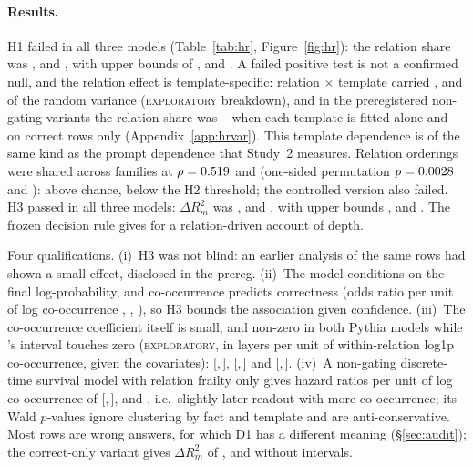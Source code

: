 \documentclass[11pt]{article}
\newcommand{\DRsq}{\ensuremath{\Delta R^{2}_{m}}\xspace} %
\newcommand{\expl}{\textsc{exploratory}\xspace}
\newcommand{\ci}[2]{[#1,\,#2]} %
\newcommand{\olmo}{\OlmoTwoSevenB}
\newcommand{\STwo}{Study~2\xspace} %
\begin{document}
\paragraph{Results.}
H1 failed in all three models (Table~\ref{tab:hr}, Figure~\ref{fig:hr}): the relation share was \hrIccPyOneFour, \hrIccPyTwoEight{} and \hrIccOlmoSeven, with upper bounds of \hrIccHiPyOneFour, \hrIccHiPyTwoEight{} and \hrIccHiOlmoSeven.
A failed positive test is not a confirmed null, and the relation effect is template-specific: relation $\times$ template carried \explHrShareRtPyOneFour, \explHrShareRtPyTwoEight{} and \explHrShareRtOlmoSeven{} of the random variance (\expl breakdown), and in the preregistered non-gating variants the relation share was \hrIccTemplateMin--\hrIccTemplateMax{} when each template is fitted alone and \hrIccCorrectOnlyMin--\hrIccCorrectOnlyMax{} on correct rows only (Appendix~\ref{app:hrvar}).
This template dependence is of the same kind as the prompt dependence that \STwo measures.
Relation orderings were shared across families at $\rho=0.519$ and \hrRhoPyTwoEightOlmo{} (one-sided permutation $p=0.0028$ and \hrPermPPyTwoEightOlmo): above chance, below the H2 threshold; the controlled version also failed.
H3 passed in all three models: \DRsq{} was \hrDRsqPyOneFour, \hrDRsqPyTwoEight{} and \hrDRsqOlmoSeven, with upper bounds \hrDRsqHiPyOneFour, \hrDRsqHiPyTwoEight{} and \hrDRsqHiOlmoSeven.
The frozen decision rule gives \hrDecision{} for a relation-driven account of depth.

Four qualifications.
(i)~H3 was not blind: an earlier analysis of the same rows had shown a small effect, disclosed in the prereg.
(ii)~The model conditions on the final log-probability, and co-occurrence predicts correctness (odds ratio per unit of log co-occurrence \hrOrPyOneFour, \hrOrPyTwoEight, \hrOrOlmoSeven), so H3 bounds the association given confidence.
(iii)~The co-occurrence coefficient itself is small, and non-zero in both Pythia models while \olmo's interval touches zero (\expl, in layers per unit of within-relation log1p co-occurrence, given the covariates): \explHrSlopePyOneFour{} \ci{\explHrSlopeLoPyOneFour}{\explHrSlopeHiPyOneFour}, \explHrSlopePyTwoEight{} \ci{\explHrSlopeLoPyTwoEight}{\explHrSlopeHiPyTwoEight} and \explHrSlopeOlmoSeven{} \ci{\explHrSlopeLoOlmoSeven}{\explHrSlopeHiOlmoSeven}.
(iv)~A non-gating discrete-time survival model with relation frailty only gives hazard ratios per unit of log co-occurrence of \hrSurvHrPyOneFour{} \ci{\hrSurvHrLoPyOneFour}{\hrSurvHrHiPyOneFour}, \hrSurvHrPyTwoEight{} and \hrSurvHrOlmoSeven, i.e.\ slightly later readout with more co-occurrence; its Wald $p$-values ignore clustering by fact and template and are anti-conservative.
Most rows are wrong answers, for which D1 has a different meaning (\S\ref{sec:audit}); the correct-only variant gives \DRsq{} of \hrDRsqCorrectOnlyPyOneFour, \hrDRsqCorrectOnlyPyTwoEight{} and \hrDRsqCorrectOnlyOlmoSeven{} without intervals.
\end{document}

